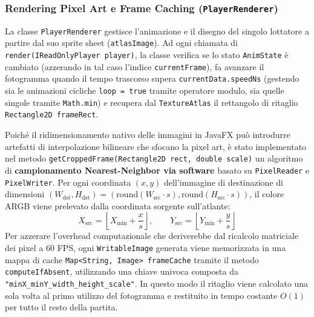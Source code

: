 \documentclass[11pt, a4paper]{article}
\begin{document}
\subsubsection{Rendering Pixel Art e Frame Caching (\texttt{PlayerRenderer})}
La classe \texttt{PlayerRenderer} gestisce l'animazione e il disegno del singolo lottatore a partire dal suo sprite sheet (\texttt{atlasImage}). Ad ogni chiamata di \texttt{render(IReadOnlyPlayer player)}, la classe verifica se lo stato \texttt{AnimState} è cambiato (azzerando in tal caso l'indice \texttt{currentFrame}), fa avanzare il fotogramma quando il tempo trascorso supera \texttt{currentData.speedNs} (gestendo sia le animazioni cicliche \texttt{loop = true} tramite operatore modulo, sia quelle singole tramite \texttt{Math.min}) e recupera dal \texttt{TextureAtlas} il rettangolo di ritaglio \texttt{Rectangle2D frameRect}.

Poiché il ridimensionamento nativo delle immagini in JavaFX può introdurre artefatti di interpolazione bilineare che sfocano la pixel art, è stato implementato nel metodo \texttt{getCroppedFrame(Rectangle2D rect, double scale)} un algoritmo di \textbf{campionamento Nearest-Neighbor via software} basato su \texttt{PixelReader} e \texttt{PixelWriter}. Per ogni coordinata $(x, y)$ dell'immagine di destinazione di dimensioni $(W_{\text{dst}}, H_{\text{dst}}) = (\text{round}(W_{\text{src}} \cdot s), \text{round}(H_{\text{src}} \cdot s))$, il colore ARGB viene prelevato dalla coordinata sorgente sull'atlante:
\begin{equation}
    X_{\text{src}} = \left\lfloor X_{\min} + \frac{x}{s} \right\rfloor, \qquad Y_{\text{src}} = \left\lfloor Y_{\min} + \frac{y}{s} \right\rfloor
\end{equation}
Per azzerare l'overhead computazionale che deriverebbe dal ricalcolo matriciale dei pixel a 60 FPS, ogni \texttt{WritableImage} generata viene memorizzata in una mappa di cache \texttt{Map<String, Image> frameCache} tramite il metodo \texttt{computeIfAbsent}, utilizzando una chiave univoca composta da \texttt{"minX\_minY\_width\_height\_scale"}. In questo modo il ritaglio viene calcolato una sola volta al primo utilizzo del fotogramma e restituito in tempo costante $O(1)$ per tutto il resto della partita.
\end{document}
